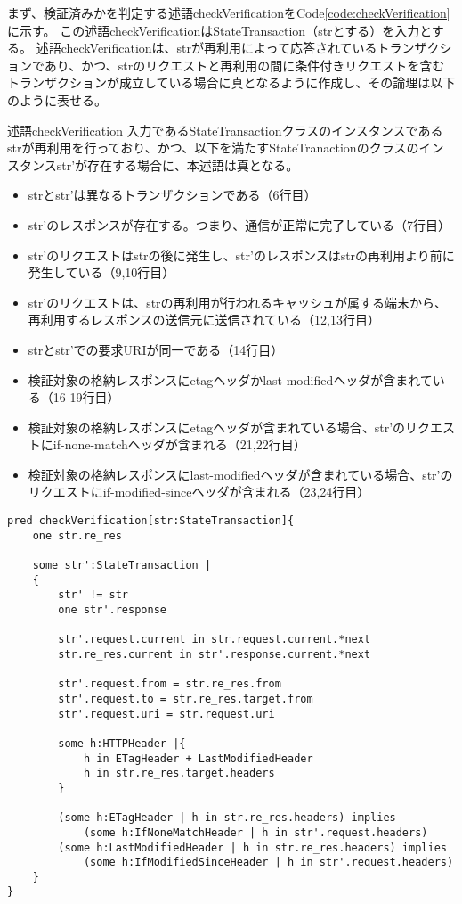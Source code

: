 \documentclass[journal]{IEEEtran}
\begin{document}
まず、検証済みかを判定する述語checkVerificationをCode\ref{code:checkVerification}に示す。
この述語checkVerificationはStateTransaction（strとする）を入力とする。
述語checkVerificationは、strが再利用によって応答されているトランザクションであり、かつ、strのリクエストと再利用の間に条件付きリクエストを含むトランザクションが成立している場合に真となるように作成し、その論理は以下のように表せる。

\begin{itembox}[l]{述語checkVerification}
入力であるStateTransactionクラスのインスタンスであるstrが再利用を行っており、かつ、以下を満たすStateTranactionのクラスのインスタンスstr'が存在する場合に、本述語は真となる。
\begin{itemize}
\item strとstr'は異なるトランザクションである（6行目）
\item str'のレスポンスが存在する。つまり、通信が正常に完了している（7行目）
\item str'のリクエストはstrの後に発生し、str'のレスポンスはstrの再利用より前に発生している（9,10行目）
\item str'のリクエストは、strの再利用が行われるキャッシュが属する端末から、再利用するレスポンスの送信元に送信されている（12,13行目）
\item strとstr'での要求URIが同一である（14行目）
\item 検証対象の格納レスポンスにetagヘッダかlast-modifiedヘッダが含まれている（16-19行目）
\item 検証対象の格納レスポンスにetagヘッダが含まれている場合、str'のリクエストにif-none-matchヘッダが含まれる（21,22行目）
\item 検証対象の格納レスポンスにlast-modifiedヘッダが含まれている場合、str'のリクエストにif-modified-sinceヘッダが含まれる（23,24行目）
\end{itemize}
\end{itembox}

\begin{lstlisting}[caption=ある再利用が検証済みか判定する述語, label=code:checkVerification]
pred checkVerification[str:StateTransaction]{
	one str.re_res

	some str':StateTransaction |
	{
		str' != str
		one str'.response

		str'.request.current in str.request.current.*next
		str.re_res.current in str'.response.current.*next

		str'.request.from = str.re_res.from
		str'.request.to = str.re_res.target.from
		str'.request.uri = str.request.uri

		some h:HTTPHeader |{
			h in ETagHeader + LastModifiedHeader
			h in str.re_res.target.headers
		}

		(some h:ETagHeader | h in str.re_res.headers) implies
			(some h:IfNoneMatchHeader | h in str'.request.headers)
		(some h:LastModifiedHeader | h in str.re_res.headers) implies
			(some h:IfModifiedSinceHeader | h in str'.request.headers)
	}
}
\end{lstlisting}
\end{document}
